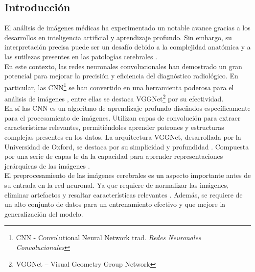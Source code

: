 \documentclass[12pt,twoside,titlepage]{ingenius}
\begin{document}
\begin{multicols}{2}

\section{Introducción}

\vspace{-0.15cm}

% 
%
%

El análisis de imágenes médicas ha experimentado un notable avance gracias a los desarrollos en inteligencia artificial y aprendizaje profundo. Sin embargo, su interpretación precisa puede ser un desafío debido a la complejidad anatómica y a las sutilezas presentes en las patologías cerebrales \cite{1}.\\

En este contexto, las redes neuronales convolucionales han demostrado un gran potencial para mejorar la precisión y eficiencia del diagnóstico radiológico. En particular, las CNN\footnote{CNN - Convolutional Neural Network trad. \textit{Redes Neuronales Convolucionales}}  se han convertido en una herramienta poderosa para el análisis de imágenes \cite{2}, entre ellas se destaca VGGNet\footnote{VGGNet – Visual Geometry Group Network}  por su efectividad.\\

En sí las CNN es un algoritmo de aprendizaje profundo diseñados específicamente para el procesamiento de imágenes. Utilizan capas de convolución para extraer características relevantes, permitiéndoles aprender patrones y estructuras complejas presentes en los datos. La arquitectura VGGNet, desarrollada por la Universidad de Oxford, se destaca por su simplicidad y profundidad \cite{3}. Compuesta por una serie de capas le da la capacidad para aprender representaciones jerárquicas de las imágenes \cite{3}.\\

El preprocesamiento de las imágenes cerebrales es un aspecto importante antes de su entrada en la red neuronal. Ya que requiere de normalizar las imágenes, eliminar artefactos y resaltar características relevantes \cite{4}. Además, se requiere de un alto conjunto de datos para un entrenamiento efectivo y que mejore la generalización del modelo.\\


\end{multicols}
\end{document}
